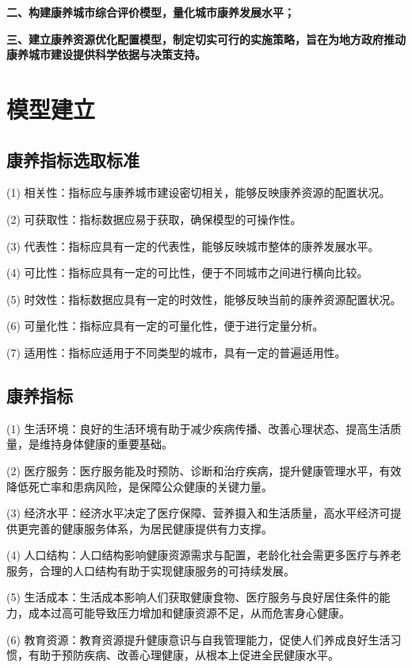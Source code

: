 \documentclass[12pt,a4paper]{article}
\begin{document}
\textbf{二、构建康养城市综合评价模型，量化城市康养发展水平；}

\textbf{三、建立康养资源优化配置模型，制定切实可行的实施策略，旨在为地方政府推动康养城市建设提供科学依据与决策支持。}

\section{模型建立}

\subsection{康养指标选取标准}

(1) 相关性：指标应与康养城市建设密切相关，能够反映康养资源的配置状况。

(2) 可获取性：指标数据应易于获取，确保模型的可操作性。

(3) 代表性：指标应具有一定的代表性，能够反映城市整体的康养发展水平。

(4) 可比性：指标应具有一定的可比性，便于不同城市之间进行横向比较。

(5) 时效性：指标数据应具有一定的时效性，能够反映当前的康养资源配置状况。

(6) 可量化性：指标应具有一定的可量化性，便于进行定量分析。

(7) 适用性：指标应适用于不同类型的城市，具有一定的普遍适用性。

\subsection{康养指标}

(1) 生活环境：良好的生活环境有助于减少疾病传播、改善心理状态、提高生活质量，是维持身体健康的重要基础。

(2) 医疗服务：医疗服务能及时预防、诊断和治疗疾病，提升健康管理水平，有效降低死亡率和患病风险，是保障公众健康的关键力量。

(3) 经济水平：经济水平决定了医疗保障、营养摄入和生活质量，高水平经济可提供更完善的健康服务体系，为居民健康提供有力支撑。

(4) 人口结构：人口结构影响健康资源需求与配置，老龄化社会需更多医疗与养老服务，合理的人口结构有助于实现健康服务的可持续发展。

(5) 生活成本：生活成本影响人们获取健康食物、医疗服务与良好居住条件的能力，成本过高可能导致压力增加和健康资源不足，从而危害身心健康。

(6) 教育资源：教育资源提升健康意识与自我管理能力，促使人们养成良好生活习惯，有助于预防疾病、改善心理健康，从根本上促进全民健康水平。
\end{document}
